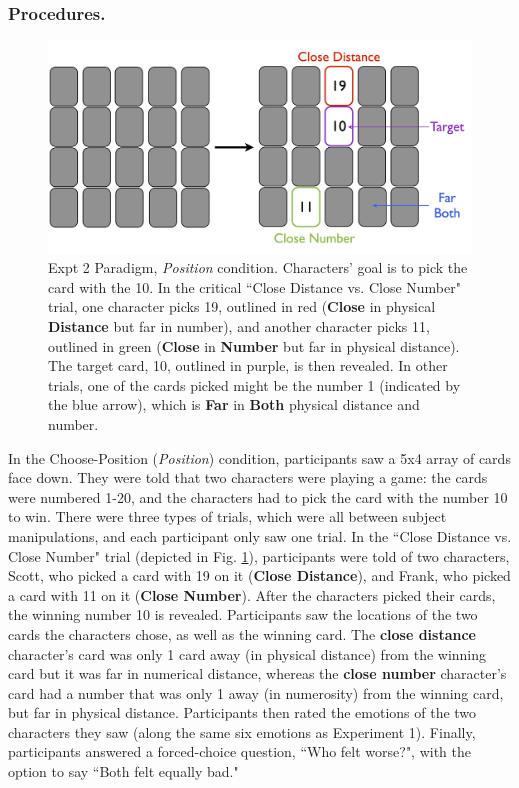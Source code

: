 \documentclass[10pt,letterpaper]{article}
\begin{document}
\subsubsection{Procedures.} 

\begin{figure}[htb!]
\includegraphics[width=\columnwidth]{images/card_paradigm.png}
\caption{ Expt 2 Paradigm, \textit{Position} condition. Characters' goal is to pick the card with the 10. In the critical ``Close Distance vs. Close Number" trial, one character picks 19, outlined in red (\textbf{Close} in physical \textbf{Distance} but far in number), and another character picks 11, outlined in green (\textbf{Close} in \textbf{Number} but far in physical distance). The target card, 10, outlined in purple, is then revealed. In other trials, one of the cards picked might be the number 1 (indicated by the blue arrow), which is \textbf{Far} in \textbf{Both} physical distance and number. }
\label{Expt2ParadigmFig}
\end{figure}



	In the Choose-Position (\textit{Position}) condition, participants saw a 5x4 array of cards face down. They were told that two characters were playing a game: the cards were numbered 1-20, and the characters had to pick the card with the number 10 to win. There were three types of trials, which were all between subject manipulations, and each participant only saw one trial. In the ``Close Distance vs. Close Number" trial (depicted in Fig. \ref{Expt2ParadigmFig}), participants were told of two characters, Scott, who picked a card with 19 on it (\textbf{Close Distance}), and Frank, who picked a card with 11 on it (\textbf{Close Number}). After the characters picked their cards, the winning number 10 is revealed. Participants saw the locations of the two cards the characters chose, as well as the winning card. The \textbf{close distance} character's card was only 1 card away (in physical distance) from the winning card but it was far in numerical distance, whereas the \textbf{close number} character's card had a number that was only 1 away (in numerosity) from the winning card, but far in physical distance. Participants then rated the emotions of the two characters they saw (along the same six emotions as Experiment 1). Finally, participants answered a forced-choice question, ``Who felt worse?", with the option to say ``Both felt equally bad."
\end{document}

